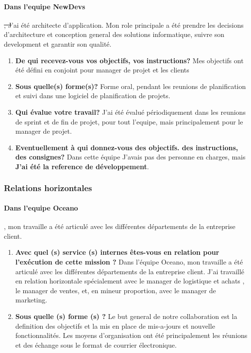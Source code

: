 \documentclass{resume} %
\providecommand{\DIFaddtex}[1]{{\protect\color{blue}\uwave{#1}}} %
\providecommand{\DIFdeltex}[1]{{\protect\color{red}\sout{#1}}}                      %
\providecommand{\DIFaddbegin}{} %
\providecommand{\DIFaddend}{} %
\providecommand{\DIFdelbegin}{} %
\providecommand{\DIFdelend}{} %
\providecommand{\DIFadd}[1]{\texorpdfstring{\DIFaddtex{#1}}{#1}} %
\providecommand{\DIFdel}[1]{\texorpdfstring{\DIFdeltex{#1}}{}} %
\begin{document}
		\paragraph{Dans l'equipe NewDevs\DIFaddbegin \DIFadd{,}\DIFaddend } \DIFdelbegin \DIFdel{, J}\DIFdelend \DIFaddbegin \DIFadd{j}\DIFaddend 'ai été architecte d'application. Mon role principale a été prendre les decisions d'architecture et conception general des solutions informatique, suivre son development et garantir son qualité. 

		 \begin{enumerate} 
		\item \textbf{De qui recevez-vous vos objectifs, vos instructions?}
			Mes objectifs ont été défini en conjoint pour manager de projet et les clients
		\item \textbf{Sous quelle(s) forme(s)?}
			Forme oral, pendant les reunions de planification et suivi dans une logiciel de planification de projets.
		\item \textbf{Qui évalue votre travail?}
			J'ai été évalué périodiquement dans les reunions de sprint et de fin de projet, pour tout l'equipe, mais principalement pour le manager de projet. 
		\item  \textbf{Eventuellement à qui donnez-vous des objectifs. des instructions, des consignes?}
			Dans cette équipe J'avais pas des  personne en charges, mais \textbf{J'ai été la reference de développement}.
		 \end{enumerate} 

					
	\subsubsection{Relations horizontales}

	
		\paragraph{Dans l'equipe Oceano},  mon travaille a été articulé  avec  les différentes départements de la entreprise client.

		 \begin{enumerate} 
		\item \textbf{ Avec quel (s) service (s) internes êtes-vous en relation pour l'exécution de cette mission ?}
			Dans l'équipe Oceano, mon travaille a été articulé  avec  les différentes départements de la entreprise client. J'ai travaillé en relation horizontale spécialement avec le manager de logistique et achats , le manager de ventes, et, en mineur proportion, avec le manager de marketing. 
		\item \textbf{Sous quelle (s) forme (s) ?}
			Le but general de notre collaboration est la definition des objectifs et la mis en place de mis-a-jours et nouvelle fonctionnalités. 
			Les moyens d'organisation ont été principalement les réunions et des échange sous le format de courrier électronique. 
		\end {enumerate}	
\end{document}
